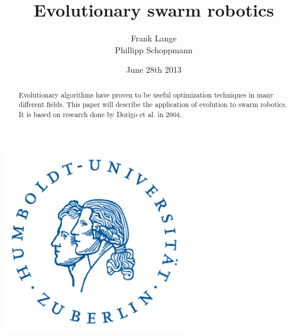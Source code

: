 \documentclass[11pt, a4paper]{article}
\begin{document}
\title{Evolutionary swarm robotics}
\author{Frank Lange\\Phillipp Schoppmann}
\date{June 28th 2013}
\maketitle
\thispagestyle{empty}

\begin{center}
\includegraphics[width = 0.6\textwidth]{pics/hulogo.pdf}
\end{center}

\vfill
\begin{abstract}\noindent
Evolutionary algorithms have proven to be useful optimization techniques in many different fields. This paper will describe the application of evolution to swarm robotics. It is based on research done by Dorigo et al. in 2004. \cite{swarmbots}
\end{abstract}

\newpage

\tableofcontents
\newpage






\end{document}
